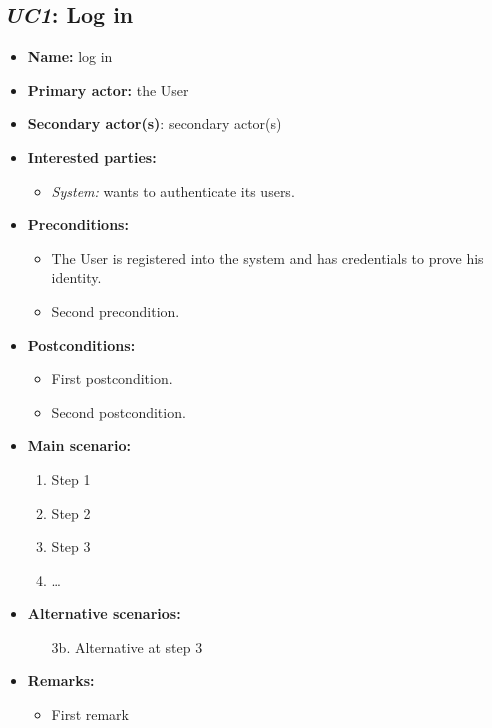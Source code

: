 \documentclass[english]{sareport}
\begin{document}
\subsection{\emph{UC1}: Log in}
\begin{itemize}
    \item \textbf{Name:} log in
    \item \textbf{Primary actor:} the User
    \item \textbf{Secondary actor(s)}: secondary actor(s)
    \item \textbf{Interested parties:} 
        \begin{itemize}
            \item \textit{System:} wants to authenticate its users.
        \end{itemize}

    \item \textbf{Preconditions:}
        \begin{itemize}
            \item The User is registered into the system and has credentials to prove his identity.
            \item Second precondition.
        \end{itemize}

    \item \textbf{Postconditions:}
        \begin{itemize}
            \item First postcondition.
            \item Second postcondition.
        \end{itemize}
        
    \item \textbf{Main scenario:} 
    \begin{enumerate}
       \item Step 1
       \item Step 2
       \item Step 3
       \item \ldots
    \end{enumerate}

    \item \textbf{Alternative scenarios:} 
    \begin{enumerate}
        \item [3b.] Alternative at step 3
    \end{enumerate}
    
    \item \textbf{Remarks:}
        \begin{itemize}
            \item First remark
        \end{itemize}
\end{itemize}
\end{document}
